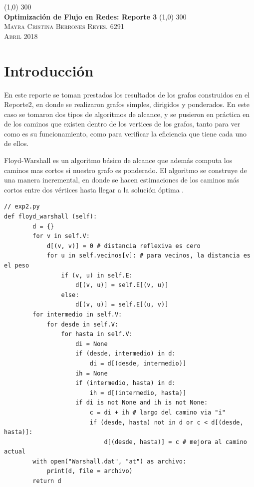 \documentclass{article}%
\begin{document}
\begin{titlepage}
	\begin{center}
	\line(1,0) {300} \\
	\huge{\textbf{Optimizaci\'on de Flujo en Redes: Reporte 3 }}
	\line(1,0) {300}\\
	
	\textsc{ \Large Mayra Cristina Berrones Reyes.  6291}\\ 
	\textsc{\Large Abril 2018} \\
	\end{center}
\end{titlepage}

\section*{Introducci\'on}

En este reporte se toman prestados los resultados de los grafos construidos en el Reporte2, \cite{reporte} en donde se realizaron grafos simples, dirigidos y ponderados. En este caso se tomaron dos tipos de algoritmos de alcance, y se pusieron en pr\'actica en de los caminos que existen dentro de los vertices de los grafos, tanto para ver como es su funcionamiento, como para verificar la eficiencia que tiene cada uno de ellos.


\begin{description}[font=$\bullet$~\normalfont\scshape\color{black}]
\item[\textbf{Floyd Warshall } ]

\end{description}

 Floyd-Warshall es un algoritmo b\'asico de alcance que adem\'as computa los caminos mas cortos si nuestro grafo es ponderado. El algoritmo se construye de una manera incremental, en donde se hacen estimaciones de los caminos m\'as cortos entre dos v\'ertices hasta llegar a la soluci\'on \'optima \cite{elisa}.
 \\
 
\begin{lstlisting}
// exp2.py
def floyd_warshall (self): 
		d = {}
		for v in self.V:
			d[(v, v)] = 0 # distancia reflexiva es cero
			for u in self.vecinos[v]: # para vecinos, la distancia es el peso
				if (v, u) in self.E:
					d[(v, u)] = self.E[(v, u)]
				else:
					d[(v, u)] = self.E[(u, v)]
		for intermedio in self.V:
			for desde in self.V:
				for hasta in self.V:
					di = None
					if (desde, intermedio) in d:
						di = d[(desde, intermedio)]
					ih = None
					if (intermedio, hasta) in d:
						ih = d[(intermedio, hasta)]
					if di is not None and ih is not None:
						c = di + ih # largo del camino via "i"
						if (desde, hasta) not in d or c < d[(desde, hasta)]:
							d[(desde, hasta)] = c # mejora al camino actual
		with open("Warshall.dat", "at") as archivo:
			print(d, file = archivo)
		return d
	
\end{lstlisting}
\end{document}
